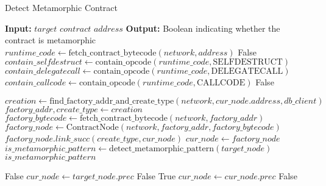 \documentclass[acmsmall,screen]{acmart}
\begin{document}
	\begin{algorithm}
		\caption{Detect Metamorphic Contract}\label{alg:detect_metamorphic_contract}
		\begin{algorithmic}[1]
			\Statex \textbf{Input:} $target$ $contract$ $address$
			\Statex \textbf{Output:} Boolean indicating whether the contract is metamorphic
				\State $runtime\_code \gets \text{fetch\_contract\_bytecode}(network, address)$
					\State \Return False
				\EndIf
				\State $contain\_selfdestruct \gets \text{contain\_opcode}(runtime\_code, \text{SELFDESTRUCT})$
				\State $contain\_delegatecall \gets \text{contain\_opcode}(runtime\_code, \text{DELEGATECALL})$
				\State $contain\_callcode \gets \text{contain\_opcode}(runtime\_code, \text{CALLCODE})$
					\State \Return False
				\EndIf

				 
				\State $creation \gets \text{find\_factory\_addr\_and\_create\_type}(network, cur\_node.address, db\_client)$
				\State $factory\_addr, create\_type \gets creation$
				\State $factory\_bytecode \gets \text{fetch\_contract\_bytecode}(network, factory\_addr)$
				\State $factory\_node \gets \text{ContractNode}(network, factory\_addr, factory\_bytecode)$
				\State $factory\_node.link\_succ(create\_type, cur\_node)$
				\State $cur\_node \gets factory\_node$
				\EndWhile
				\State $is\_metamorphic\_pattern \gets \text{detect\_metamorphic\_pattern}(target\_node)$
				\State \Return $is\_metamorphic\_pattern$
			\EndProcedure

					\State \Return False
				\EndIf
				\State $cur\_node \gets target\_node.prec$
						\State \Return False
					\EndIf
						\State \Return True
					\EndIf
					\State $cur\_node \gets cur\_node.prec$
				\EndWhile
				\State \Return False
			\EndProcedure
		\end{algorithmic}
	\end{algorithm}
\end{document}
